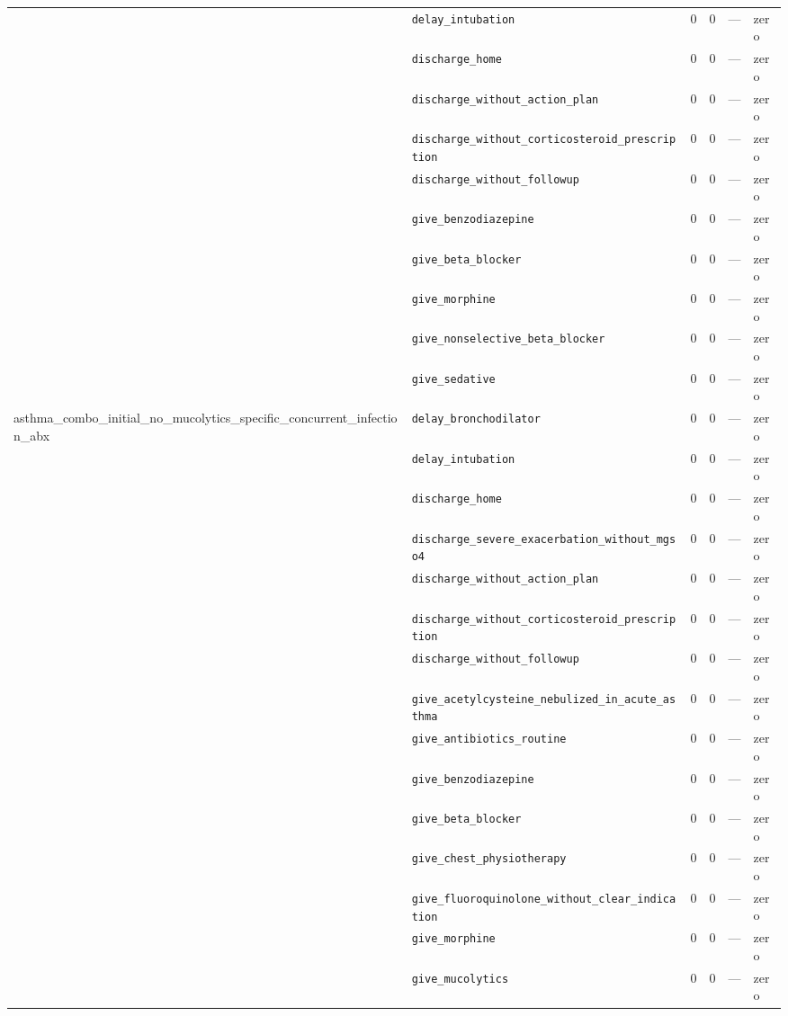 \begin{table}[ht]
\begin{tabular}{llrrrl}
 & \texttt{delay\_intubation} & 0 & 0 & — & zero \\
 & \texttt{discharge\_home} & 0 & 0 & — & zero \\
 & \texttt{discharge\_without\_action\_plan} & 0 & 0 & — & zero \\
 & \texttt{discharge\_without\_corticosteroid\_prescription} & 0 & 0 & — & zero \\
 & \texttt{discharge\_without\_followup} & 0 & 0 & — & zero \\
 & \texttt{give\_benzodiazepine} & 0 & 0 & — & zero \\
 & \texttt{give\_beta\_blocker} & 0 & 0 & — & zero \\
 & \texttt{give\_morphine} & 0 & 0 & — & zero \\
 & \texttt{give\_nonselective\_beta\_blocker} & 0 & 0 & — & zero \\
 & \texttt{give\_sedative} & 0 & 0 & — & zero \\
\midrule
asthma\_combo\_initial\_no\_mucolytics\_specific\_concurrent\_infection\_abx & \texttt{delay\_bronchodilator} & 0 & 0 & — & zero \\
 & \texttt{delay\_intubation} & 0 & 0 & — & zero \\
 & \texttt{discharge\_home} & 0 & 0 & — & zero \\
 & \texttt{discharge\_severe\_exacerbation\_without\_mgso4} & 0 & 0 & — & zero \\
 & \texttt{discharge\_without\_action\_plan} & 0 & 0 & — & zero \\
 & \texttt{discharge\_without\_corticosteroid\_prescription} & 0 & 0 & — & zero \\
 & \texttt{discharge\_without\_followup} & 0 & 0 & — & zero \\
 & \texttt{give\_acetylcysteine\_nebulized\_in\_acute\_asthma} & 0 & 0 & — & zero \\
 & \texttt{give\_antibiotics\_routine} & 0 & 0 & — & zero \\
 & \texttt{give\_benzodiazepine} & 0 & 0 & — & zero \\
 & \texttt{give\_beta\_blocker} & 0 & 0 & — & zero \\
 & \texttt{give\_chest\_physiotherapy} & 0 & 0 & — & zero \\
 & \texttt{give\_fluoroquinolone\_without\_clear\_indication} & 0 & 0 & — & zero \\
 & \texttt{give\_morphine} & 0 & 0 & — & zero \\
 & \texttt{give\_mucolytics} & 0 & 0 & — & zero \\

\end{tabular}
\end{table}
